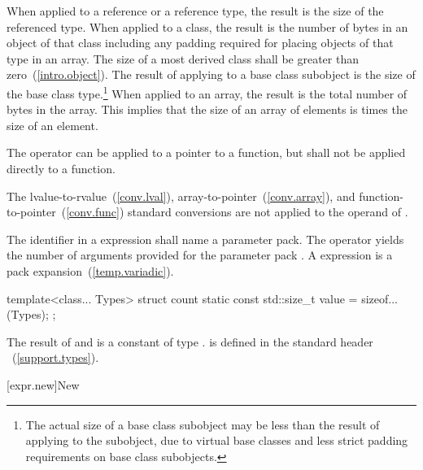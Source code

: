 \pnum
{}%
When applied to a reference or a reference type, the result is the size
of the referenced type.
%
When applied to a class, the result is the number of bytes in an object
of that class including any padding required for placing objects of that
type in an array. The size of a most derived class shall be greater than
zero~(\ref{intro.object}). The result of applying  to a
base class subobject is the size of the base class type.\footnote{The actual
size of a base class subobject may be less than the result of
applying  to the subobject, due to virtual base classes
and less strict padding requirements on base class subobjects.}
%
When applied to an array, the result is the total number of bytes in the
array. This implies that the size of an array of  elements is
 times the size of an element.

\pnum
The  operator can be applied to a pointer to a function,
but shall not be applied directly to a function.

\pnum
The lvalue-to-rvalue~(\ref{conv.lval}),
array-to-pointer~(\ref{conv.array}), and
function-to-pointer~(\ref{conv.func}) standard conversions are not
applied to the operand of .

\pnum
The identifier in a  expression shall name a parameter
pack. The  operator yields the number of arguments
provided for the parameter pack .
A  expression is a pack expansion~(\ref{temp.variadic}).
\enterexample

\begin{codeblock}
template<class... Types>
struct count {
  static const std::size_t value = sizeof...(Types);
};
\end{codeblock}
\exitexample

\pnum
The result of  and  is a constant of type
.
\enternote 
{}%
%
 is defined in the standard header
%
~(\ref{support.types}).
\exitnote 

[expr.new]{New}

